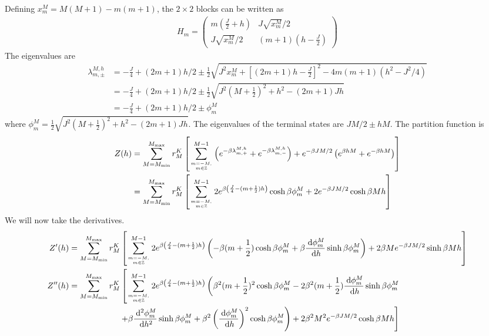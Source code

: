 \documentclass[12pt]{revtex4-2}
\begin{document}
Defining \(x^M_m = M(M+1) - m(m+1)\), the \(2\times 2\) blocks can be written as
\begin{align}
	H_m = \begin{pmatrix} m(\frac{J}{2} + h) & J\sqrt{x^M_m}/2 \\ J\sqrt{x^M_m}/2 & (m+1)(h - \frac{J}{2}) \end{pmatrix} 
\end{align}
The eigenvalues are 
\begin{align}
	\lambda_{m, \pm}^{M, h} &= -\frac{J}{4} + (2m+1)h/2 \pm \frac{1}{2}\sqrt{J^2x^M_m + \left[(2m+1)h - \frac{J}{2}\right]^2 - 4m(m+1)(h^2 - J^2/4)} \nonumber\\
				&= -\frac{J}{4} + (2m+1)h/2 \pm \frac{1}{2}\sqrt{J^2(M + \frac{1}{2})^2 + h^2 - (2m+1)Jh} \nonumber\\
				&= -\frac{J}{4} + (2m+1)h/2 \pm \phi^M_m \label{bath_field_ens}
\end{align}
where \(\phi^M_m = \frac{1}{2}\sqrt{J^2(M + \frac{1}{2})^2 + h^2 - (2m+1)Jh}\).
The eigenvalues of the terminal states are \(JM/2 \pm hM\). The partition function is
\begin{align}
	Z(h) &= \sum_{M=M_\text{min}}^{M_\text{max}}r^K_M\left[\sum_{m=-M, \atop{m\in \mathbb{Z}}}^{M-1}\left(e^{-\beta \lambda_{m, +}^{M, h}} + e^{-\beta \lambda_{m, -}^{M, h}}\right) + e^{-\beta JM/2}\left(e^{\beta hM} + e^{-\beta hM}\right)\right] \\
	     &=\sum_{M=M_\text{min}}^{M_\text{max}}r^K_M\left[\sum_{m=-M, \atop{m\in \mathbb{Z}}}^{M-1}2e^{\beta \left(\frac{J}{4} - (m+\frac{1}{2})h\right)}\cosh \beta\phi^M_m + 2e^{-\beta JM/2}\cosh \beta Mh\right]
\end{align}
We will now take the derivatives.
\begin{align}
	Z^\prime(h) &=\sum_{M=M_\text{min}}^{M_\text{max}}r^K_M\left[\sum_{m=-M, \atop{m\in \mathbb{Z}}}^{M-1}2e^{\beta \left(\frac{J}{4} - (m+\frac{1}{2})h\right)}\left(-\beta (m+\frac{1}{2}) \cosh \beta\phi^M_m + \beta\frac{\:\mathrm{d}\phi^M_m}{\:\mathrm{d}h}\sinh \beta\phi^M_m\right)+ 2\beta Me^{-\beta JM/2}\sinh \beta Mh\right]\\
	Z^{\prime\prime}(h) &=\sum_{M=M_\text{min}}^{M_\text{max}}r^K_M\left[\sum_{m=-M, \atop{m\in \mathbb{Z}}}^{M-1}2 e^{\beta \left(\frac{J}{4} - (m+\frac{1}{2})h\right)}\left(\beta^2 (m+\frac{1}{2})^2 \cosh \beta\phi^M_m - 2\beta^2 (m+\frac{1}{2})\frac{\:\mathrm{d}\phi^M_m}{\:\mathrm{d}h}\sinh \beta\phi^M_m\right.\right.\\
			    &\quad\quad\quad\quad\quad\quad\left.\left. + \beta\frac{\:\mathrm{d^2}\phi^M_m}{\:\mathrm{d}h^2}\sinh \beta\phi^M_m + \beta^2\left(\frac{\:\mathrm{d}\phi^M_m}{\:\mathrm{d}h}\right)^2 \cosh \beta\phi^M_m\right) + 2\beta^2 M^2 e^{-\beta JM/2}\cosh \beta Mh\right]\\
\end{align}
\end{document}
